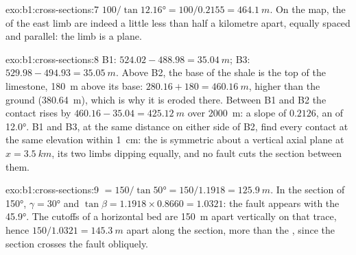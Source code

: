 \begin{solution}{exo:b1:cross-sections:7}
$100/\tan\ang{12.16} = 100/0.2155 = \qty{464.1}{m}$. On the map, the
 of the east limb are indeed a little less than half a
kilometre apart, equally spaced and parallel: the limb is a plane.
\end{solution}

\begin{solution}{exo:b1:cross-sections:8}
B1: $524.02 - 488.98 = \qty{35.04}{m}$; B3: $529.98 - 494.93 =
\qty{35.05}{m}$. Above B2, the base of the shale is the top of the
limestone, \qty{180}{m} above its base: $280.16 + 180 = \qty{460.16}{m}$,
higher than the ground (\qty{380.64}{m}), which is why it is eroded there.
Between B1 and B2 the contact rises by $460.16 - 35.04 = \qty{425.12}{m}$
over \qty{2000}{m}: a slope of $0.2126$, an  of \ang{12.0}. B1
and B3, at the same distance on either side of B2, find every contact at the
same elevation within \qty{1}{cm}: the  is symmetric about a vertical
axial plane at $x = \qty{3.5}{km}$, its two limbs dipping equally, and no
fault cuts the section between them.
\end{solution}

\begin{solution}{exo:b1:cross-sections:9}
 $= 150/\tan\ang{50} = 150/1.1918 = \qty{125.9}{m}$. In the section of
 \ang{150}, $\gamma = \ang{30}$ and $\tan\beta = 1.1918\times0.8660 =
1.0321$: the fault appears with the  \ang{45.9}. The cutoffs of
a horizontal bed are \qty{150}{m} apart vertically on that trace, hence
$150/1.0321 = \qty{145.3}{m}$ apart along the section, more than the ,
since the section crosses the fault obliquely.
\end{solution}

